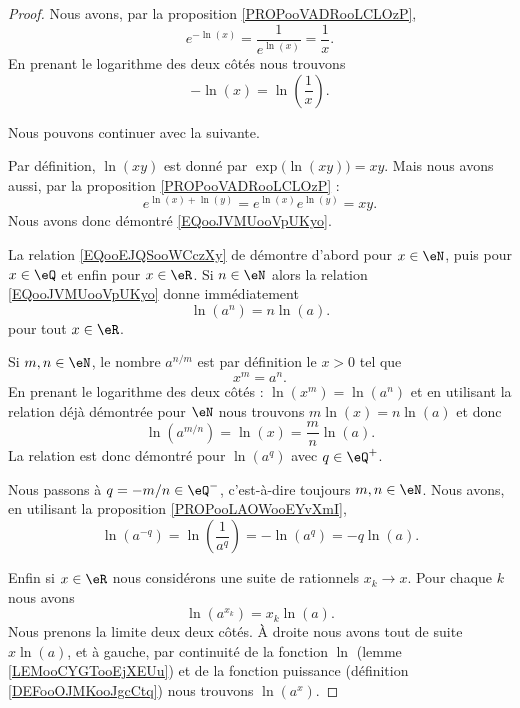 \begin{proof}
	Nous avons, par la proposition \ref{PROPooVADRooLCLOzP},
	\begin{equation}
		e^{-\ln(x)}=\frac{1}{  e^{\ln(x)} }=\frac{1}{ x }.
	\end{equation}
	En prenant le logarithme des deux côtés nous trouvons
	\begin{equation}
		-\ln(x)=\ln\left( \frac{1}{ x } \right).
	\end{equation}

	Nous pouvons continuer avec la suivante.

	Par définition, \( \ln(xy)\) est donné par \( \exp\big( \ln(xy) \big)=xy\). Mais nous avons aussi, par la proposition \ref{PROPooVADRooLCLOzP} :
	\begin{equation}
		e^{\ln(x)+\ln(y)}=e^{\ln(x)}e^{\ln(y)}=xy.
	\end{equation}
	Nous avons donc démontré \eqref{EQooJVMUooVpUKyo}.

	La relation \eqref{EQooEJQSooWCczXy} de démontre d'abord pour \( x\in \eN\), puis pour \( x\in \eQ\) et enfin pour \( x\in\eR\). Si \( n\in \eN\) alors la relation \eqref{EQooJVMUooVpUKyo} donne immédiatement
	\begin{equation}
		\ln(a^n)=n\ln(a).
	\end{equation}
	pour tout \( x\in \eR\).

	Si \( m,n\in \eN\), le nombre \( a^{n/m}\) est par définition le \( x>0\) tel que
	\begin{equation}
		x^m=a^n.
	\end{equation}
	En prenant le logarithme des deux côtés : \( \ln(x^m)=\ln(a^n)\) et en utilisant la relation déjà démontrée pour \( \eN\) nous trouvons \( m\ln(x)=n\ln(a)\) et donc
	\begin{equation}
		\ln(a^{m/n})=\ln(x)=\frac{ m }{ n }\ln(a).
	\end{equation}
	La relation est donc démontré pour \( \ln(a^q)\) avec \( q\in \eQ^+\).

	Nous passons à \( q=-m/n\in \eQ^-\), c'est-à-dire toujours \( m,n\in \eN\). Nous avons, en utilisant la proposition \ref{PROPooLAOWooEYvXmI},
	\begin{equation}
		\ln(a^{-q})=\ln(\frac{1}{ a^q })=-\ln(a^q)=-q\ln(a).
	\end{equation}

	Enfin si \( x\in \eR\) nous considérons une suite de rationnels \( x_k\to x\). Pour chaque \( k\) nous avons
	\begin{equation}
		\ln(a^{x_k})=x_k\ln(a).
	\end{equation}
	Nous prenons la limite deux deux côtés. À droite nous avons tout de suite \( x\ln(a)\), et à gauche, par continuité de la fonction \( \ln\) (lemme \ref{LEMooCYGTooEjXEUu}) et de la fonction puissance (définition \ref{DEFooOJMKooJgcCtq}) nous trouvons \( \ln(a^x)\).
\end{proof}

